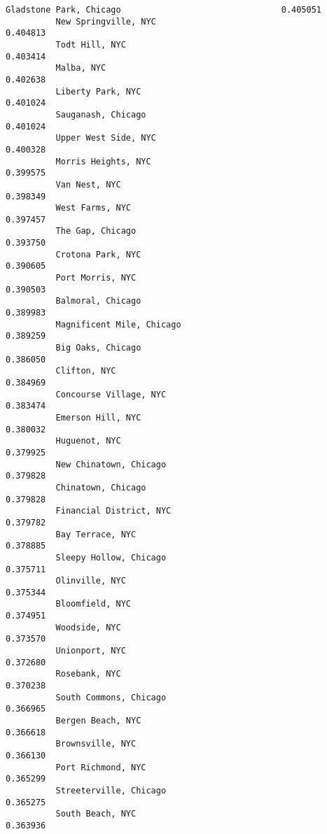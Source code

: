 \documentclass[11pt]{article}
\begin{document}
\begin{Verbatim}[commandchars=\\\{\}]
          Gladstone Park, Chicago                                0.405051
          New Springville, NYC                                   0.404813
          Todt Hill, NYC                                         0.403414
          Malba, NYC                                             0.402638
          Liberty Park, NYC                                      0.401024
          Sauganash, Chicago                                     0.401024
          Upper West Side, NYC                                   0.400328
          Morris Heights, NYC                                    0.399575
          Van Nest, NYC                                          0.398349
          West Farms, NYC                                        0.397457
          The Gap, Chicago                                       0.393750
          Crotona Park, NYC                                      0.390605
          Port Morris, NYC                                       0.390503
          Balmoral, Chicago                                      0.389983
          Magnificent Mile, Chicago                              0.389259
          Big Oaks, Chicago                                      0.386050
          Clifton, NYC                                           0.384969
          Concourse Village, NYC                                 0.383474
          Emerson Hill, NYC                                      0.380032
          Huguenot, NYC                                          0.379925
          New Chinatown, Chicago                                 0.379828
          Chinatown, Chicago                                     0.379828
          Financial District, NYC                                0.379782
          Bay Terrace, NYC                                       0.378885
          Sleepy Hollow, Chicago                                 0.375711
          Olinville, NYC                                         0.375344
          Bloomfield, NYC                                        0.374951
          Woodside, NYC                                          0.373570
          Unionport, NYC                                         0.372680
          Rosebank, NYC                                          0.370238
          South Commons, Chicago                                 0.366965
          Bergen Beach, NYC                                      0.366618
          Brownsville, NYC                                       0.366130
          Port Richmond, NYC                                     0.365299
          Streeterville, Chicago                                 0.365275
          South Beach, NYC                                       0.363936

\end{Verbatim}
\end{document}
